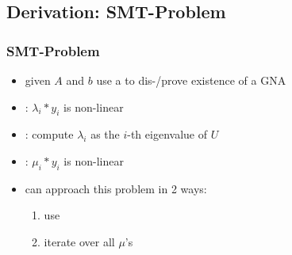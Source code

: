 \subsection{Derivation: SMT-Problem}
\begin{frame}
	\frametitle{SMT-Problem}
	\begin{itemize}
		\item given $A$ and $b$ use a \solver to dis-/prove existence of a GNA
		\item {}: $\lambda_i*y_i$ is non-linear
		\item[] : compute $\lambda_i$ as the $i$-th eigenvalue of $U$
		\item {}: $\mu_i*y_i$ is non-linear
		\item[] can approach this problem in 2 ways:
			\begin{enumerate}
				\item use \qfnia
				\item iterate over all $\mu$'s
			\end{enumerate}
	\end{itemize}
\end{frame}

